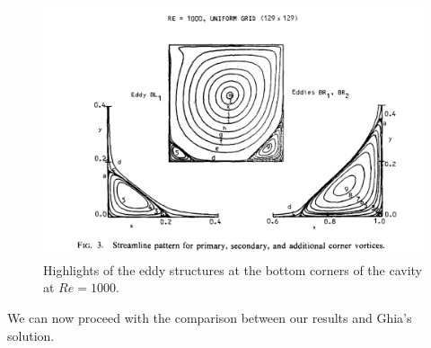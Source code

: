 \begin{figure}[H]
    \centering
    \includegraphics[width=.9\textwidth]{./img/ghia_solution_Re1000}
    \caption{Highlights of the eddy structures at the bottom corners of the cavity at $Re = 1000$.}
    \label{fig:ghia_solution_Re1000}
\end{figure}

We can now proceed with the comparison between our results and Ghia's solution.